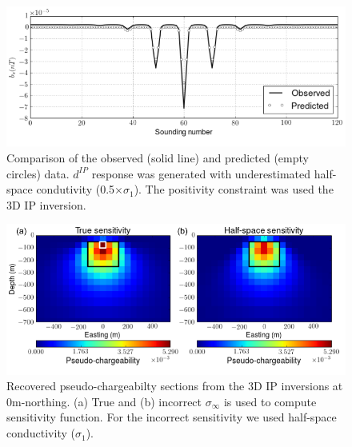 \documentclass[a4paper, 11pt]{article}
\newcommand{\siginf}{\sigma_\infty}
\newcommand{\dip}{d^{IP}}
\begin{document}
\begin{figure}[htb]
  \centering
  \includegraphics[width=1.\textwidth]{figures/Reg_obspred.png}
  \caption{Comparison of the observed (solid line) and predicted (empty circles) data. $\dip$ response was generated with underestimated half-space condutivity (0.5$\times \sigma_1$). The positivity constraint was used the 3D IP inversion.}
  \label{F:Reg_obspred}
\end{figure}

\begin{figure}[htb]
  \centering
  \includegraphics[width=1.\textwidth]{figures/True_vs_approx_sensitivity.png}
  \caption{Recovered pseudo-chargeabilty sections from the 3D IP inversions at 0m-northing.  (a) True and (b) incorrect $\siginf$ is used to compute sensitivity function. For the incorrect sensitivity we used half-space conductivity ($\sigma_1$).}
  \label{F:True_vs_approx_sensitivity}
\end{figure}
\clearpage

\end{document}
